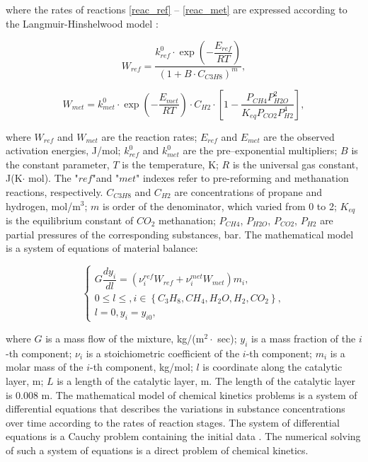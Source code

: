 \documentclass{svproc}
\begin{document}
where the rates of reactions \eqref{reac_ref} -- \eqref{reac_met} are expressed according to the Langmuir-Hinshelwood model \cite{USKOV2019126741}:

\[
W_{ref} = \dfrac{k_{ref}^0 \cdot \exp \left(- \dfrac{E_{ref}}{RT} \right) }{\left(1 + B \cdot C_{C3H8}\right)^m},
\]

\[
W_{met} = k_{met}^0 \cdot \exp \left(- \dfrac{E_{met}}{RT} \right) \cdot C_{H2} \cdot \left[1 - \dfrac{P_{CH4} P_{H2O}^2}{K_{eq} P_{CO2} P_{H2}^4 }\right] ,
\]

where $W_{ref}$ and $W_{met}$ are the reaction rates; $E_{ref}$ and $E_{met}$ are the observed activation energies, J/mol; $k^0_{ref}$ and $k^0_{met}$ are the pre–exponential multipliers; $B$ is the constant parameter, $T$ is the temperature, K; $R$ is the universal gas constant, J(K$\cdot$ mol). The "$ref$"and "$met$" indexes refer to pre-reforming and methanation reactions, respectively. $C_{C3H8}$ and $C_{H2}$ are concentrations of propane and hydrogen, mol/m$^3$; $m$ is order of the denominator, which varied from 0 to 2; $K_{eq}$ is the equilibrium constant of $CO_2$ methanation; $P_{CH4}$, $P_{H2O}$, $P_{CO2}$, $P_{H2}$ are partial pressures of the corresponding substances, bar. The mathematical model is a system of equations of material balance:

\begin{equation}\label{mater_balance}
\begin{cases}
G \dfrac{dy_i}{dl} = \left(\nu_i^{ref} W_{ref} + \nu_i^{met} W_{met} \right) m_i, 
\\
0 \le l \le , i \in \left\lbrace C_3H_8, CH_4, H_2O, H_2, CO_2 \right\rbrace,
\\
l = 0, y_i = y_{i0},
\end{cases}
\end{equation}

where $G$ is a mass flow of the mixture, kg/(m$^2 \cdot$ sec); $y_i$ is a mass fraction of the $i$-th component; $\nu_i$ is a stoichiometric coefficient of the $i$-th component; $m_i$ is a molar mass of the $i$-th component, kg/mol; $l$ is coordinate along the catalytic layer, m; $L$ is a length of the catalytic layer, m. The length of the catalytic layer is 0.008 m. The mathematical model of chemical kinetics problems is a system of differential equations that describes the variations in substance concentrations over time according to the rates of reaction stages. The system of differential equations is a Cauchy problem containing the initial data \cite{ENIKEEV2020123131, Chainikova}. The numerical solving of such a system of equations is a direct problem of chemical kinetics. 
\end{document}
